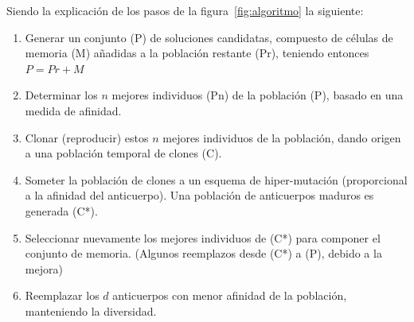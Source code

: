 Siendo la explicación de los pasos de la figura~\ref{fig:algoritmo} la siguiente:
\begin{enumerate}
    \item Generar un conjunto (P) de soluciones candidatas, compuesto de células de memoria (M) añadidas a la población restante (Pr), teniendo entonces $P = Pr + M$
    \item Determinar los $n$ mejores individuos (Pn) de la población (P), basado en una medida de afinidad.
    \item Clonar (reproducir) estos $n$ mejores individuos de la población, dando origen a una población temporal de clones (C).
    \item Someter la población de clones a un esquema de hiper-mutación (proporcional a la afinidad del anticuerpo). Una población de anticuerpos maduros es generada (C*).
    \item Seleccionar nuevamente los mejores individuos de (C*) para componer el conjunto de memoria. (Algunos reemplazos desde (C*) a (P), debido a la mejora)
    \item Reemplazar los $d$ anticuerpos con menor afinidad de la población, manteniendo la diversidad.
\end{enumerate}

